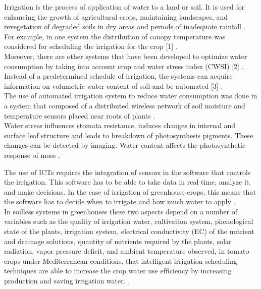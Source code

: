 \documentclass[letterpaper, 10 pt, conference]{ieeeconf}  %
\begin{document}
Irrigation is the process of application of water to a land or soil. It is used for enhancing the growth of agricultural crops, maintaining landscapes, and revegetation of degraded soils in dry areas and periods of inadequate rainfall \cite{Mrinmayi2016}. \\

For example, in one system the distribution of canopy temperature was considered for scheduling the irrigation for the crop [1]  \cite{Mrinmayi2016}. \\

Moreover, there are other systems that have been developed to optimize water consumption by taking into account crop and water stress index (CWSI) [2]  \cite{Mrinmayi2016}. \\

Instead of a predetermined schedule of irrigation, the systems can acquire information on volumetric water content of soil and be automated [3]  \cite{Mrinmayi2016}. \\
The use of automated irrigation system to reduce water consumption was done in a system that composed of a distributed wireless network of soil moisture and temperature sensors placed near roots of plants \cite{Mrinmayi2016}. \\


Water stress inﬂuences stomata resistance, induces changes in internal and surface leaf structure and leads to breakdown of photosynthesis pigments. These changes can be detected by imaging. Water content affects the photosynthetic response of moss  \cite{Hendrawan2011}.

The use of ICTs requires the integration of sensors in the software that controls the irrigation. This software has to be able to take data in real time, analyze it, and make decisions. In the case of irrigation of greenhouse crops, this means that the software has to decide when to irrigate and how much water to apply \cite{Rodriguez-Ortega2017}. \\

In soilless systems in greenhouses these two aspects depend on a number of variables such as the quality of irrigation water, cultivation system, phenological state of the plants, irrigation system, electrical conductivity (EC) of the nutrient and drainage solutions, quantity of nutrients required by the plants, solar radiation, vapor pressure deﬁcit, and ambient temperature observed, in tomato crops under Mediterranean conditions, that intelligent irrigation scheduling techniques are able to increase the crop water use efﬁciency by increasing production and saving irrigation water.   \cite{Rodriguez-Ortega2017}. \\
\end{document}
